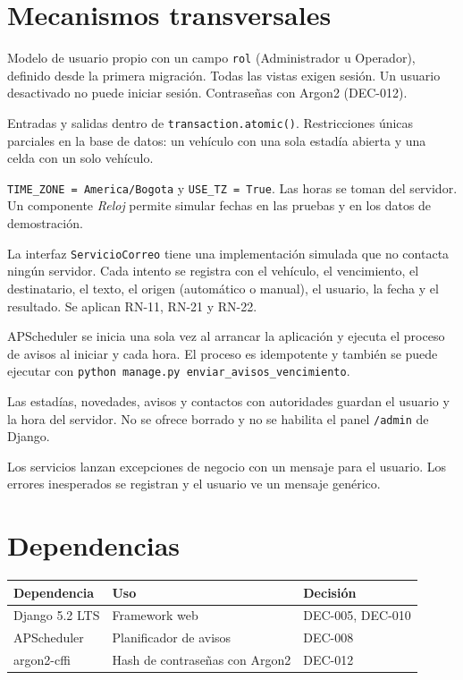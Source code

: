 \section{Mecanismos transversales}
\begin{description}[style=nextline]
  \item[Autenticación y autorización] Modelo de usuario propio con un campo \texttt{rol} (Administrador u Operador), definido desde la primera migración. Todas las vistas exigen sesión. Un usuario desactivado no puede iniciar sesión. Contraseñas con Argon2 (DEC-012).
  \item[Integridad y concurrencia] Entradas y salidas dentro de \texttt{transaction.atomic()}. Restricciones únicas parciales en la base de datos: un vehículo con una sola estadía abierta y una celda con un solo vehículo.
  \item[Fechas y reloj] \texttt{TIME\_ZONE = America/Bogota} y \texttt{USE\_TZ = True}. Las horas se toman del servidor. Un componente \emph{Reloj} permite simular fechas en las pruebas y en los datos de demostración.
  \item[Correo simulado] La interfaz \texttt{ServicioCorreo} tiene una implementación simulada que no contacta ningún servidor. Cada intento se registra con el vehículo, el vencimiento, el destinatario, el texto, el origen (automático o manual), el usuario, la fecha y el resultado. Se aplican RN-11, RN-21 y RN-22.
  \item[Planificador] APScheduler se inicia una sola vez al arrancar la aplicación y ejecuta el proceso de avisos al iniciar y cada hora. El proceso es idempotente y también se puede ejecutar con \texttt{python manage.py enviar\_avisos\_vencimiento}.
  \item[Trazabilidad] Las estadías, novedades, avisos y contactos con autoridades guardan el usuario y la hora del servidor. No se ofrece borrado y no se habilita el panel \texttt{/admin} de Django.
  \item[Errores] Los servicios lanzan excepciones de negocio con un mensaje para el usuario. Los errores inesperados se registran y el usuario ve un mensaje genérico.
\end{description}

\section{Dependencias}
\begin{longtable}{>{\raggedright\arraybackslash}p{4cm}>{\raggedright\arraybackslash}p{6.4cm}>{\raggedright\arraybackslash}p{4cm}}
\toprule
\textbf{Dependencia} & \textbf{Uso} & \textbf{Decisión}\\
\midrule\endhead
Django 5.2 LTS & Framework web & DEC-005, DEC-010\\
APScheduler & Planificador de avisos & DEC-008\\
argon2-cffi & Hash de contraseñas con Argon2 & DEC-012\\
\bottomrule
\end{longtable}

